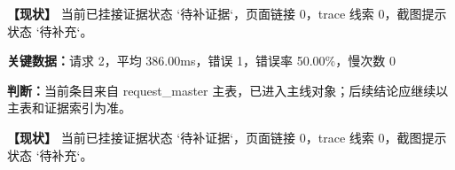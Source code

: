 \noindent\textbf{【现状】} 当前已挂接证据状态 `待补证据`，页面链接 0，trace 线索 0，截图提示状态 `待补充`。\par

\vspace{0.35em}\par

\noindent\textbf{关键数据：}请求 2，平均 386.00ms，错误 1，错误率 50.00\%，慢次数 0\par

\noindent\textbf{判断：}当前条目来自 request\_master 主表，已进入主线对象；后续结论应继续以主表和证据索引为准。\par

\noindent\textbf{【现状】} 当前已挂接证据状态 `待补证据`，页面链接 0，trace 线索 0，截图提示状态 `待补充`。\par
